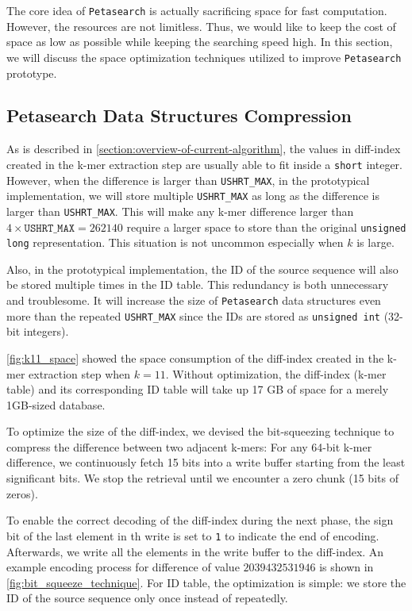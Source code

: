 The core idea of \texttt{Petasearch} is actually sacrificing space for fast computation.
However, the resources are not limitless.
Thus, we would like to keep the cost of space as low as possible while keeping the searching speed high.
In this section, we will discuss the space optimization techniques utilized to improve \texttt{Petasearch} prototype.

\subsection{Petasearch Data Structures Compression} \label{section:diff-index_compression}

As is described in \cref{section:overview-of-current-algorithm}, the values in diff-index created in the k-mer extraction step are usually able to fit inside a \texttt{short} integer.
However, when the difference is larger than \texttt{USHRT\_MAX}, in the prototypical implementation, we will store multiple \texttt{USHRT\_MAX} as long as the difference is larger than \texttt{USHRT\_MAX}.
This will make any k-mer difference larger than $4 \times \mathtt{USHRT\_MAX} = 262140$ require a larger space to store than the original \texttt{unsigned long} representation.
This situation is not uncommon especially when $k$ is large.

Also, in the prototypical implementation, the ID of the source sequence will also be stored multiple times in the ID table.
This redundancy is both unnecessary and troublesome.
It will increase the size of \texttt{Petasearch} data structures even more than the repeated \texttt{USHRT\_MAX} since the IDs are stored as \texttt{unsigned int} (32-bit integers).

\autoref{fig:k11_space} showed the space consumption of the diff-index created in the k-mer extraction step when $k = 11$.
Without optimization, the diff-index (k-mer table) and its corresponding ID table will take up 17 GB of space for a merely 1GB-sized database.

To optimize the size of the diff-index, we devised the bit-squeezing technique to compress the difference between two adjacent k-mers:
For any 64-bit k-mer difference, we continuously fetch 15 bits into a write buffer starting from the least significant bits.
We stop the retrieval until we encounter a zero chunk (15 bits of zeros).

To enable the correct decoding of the diff-index during the next phase, the sign bit of the last element in th write is set to \texttt{1} to indicate the end of encoding.
Afterwards, we write all the elements in the write buffer to the diff-index.
An example encoding process for difference of value $2039432531946$ is shown in \autoref{fig:bit_squeeze_technique}.
For ID table, the optimization is simple: we store the ID of the source sequence only once instead of repeatedly.

